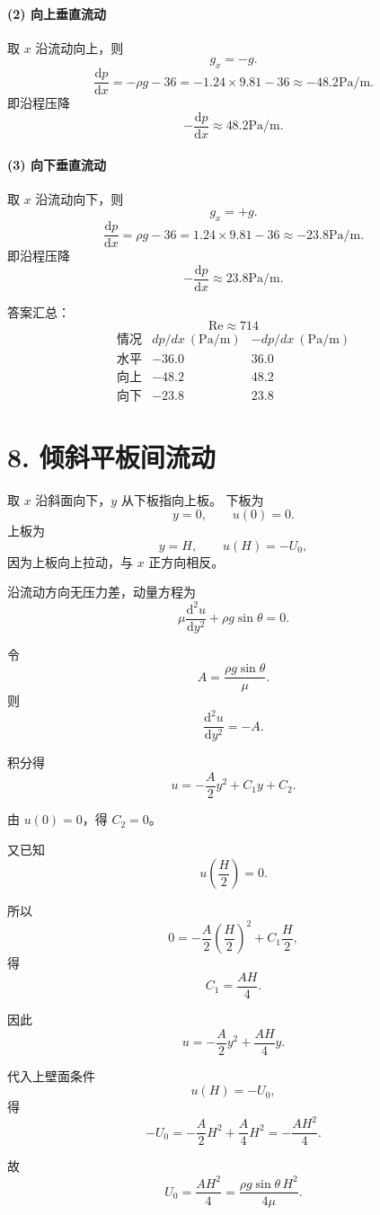 \documentclass[12pt,a4paper]{ctexart}
\newcommand{\Rey}{\mathrm{Re}}
\newcommand{\dd}{\mathrm d}
\begin{document}
\paragraph{(2) 向上垂直流动}
取 \(x\) 沿流动向上，则
\[
g_x=-g.
\]
\[
\frac{\dd p}{\dd x}
=-\rho g-36
=-1.24\times9.81-36
\approx-48.2\mathrm{Pa/m}.
\]
即沿程压降
\[
-\frac{\dd p}{\dd x}\approx48.2\mathrm{Pa/m}.
\]

\paragraph{(3) 向下垂直流动}
取 \(x\) 沿流动向下，则
\[
g_x=+g.
\]
\[
\frac{\dd p}{\dd x}
=\rho g-36
=1.24\times9.81-36
\approx-23.8\mathrm{Pa/m}.
\]
即沿程压降
\[
-\frac{\dd p}{\dd x}\approx23.8\mathrm{Pa/m}.
\]

答案汇总：
\[
\boxed{
\Rey\approx714
}
\]
\[
\boxed{
\begin{array}{c|c|c}
\text{情况} & dp/dx\ (\mathrm{Pa/m}) & -dp/dx\ (\mathrm{Pa/m})\\
\hline
\text{水平} & -36.0 & 36.0\\
\text{向上} & -48.2 & 48.2\\
\text{向下} & -23.8 & 23.8
\end{array}
}
\]

\section*{8. 倾斜平板间流动}

取 \(x\) 沿斜面向下，\(y\) 从下板指向上板。
下板为
\[
y=0,\qquad u(0)=0.
\]
上板为
\[
y=H,\qquad u(H)=-U_0,
\]
因为上板向上拉动，与 \(x\) 正方向相反。

沿流动方向无压力差，动量方程为
\[
\mu\frac{\dd^2u}{\dd y^2}+\rho g\sin\theta=0.
\]

令
\[
A=\frac{\rho g\sin\theta}{\mu}.
\]
则
\[
\frac{\dd^2u}{\dd y^2}=-A.
\]

积分得
\[
u=-\frac A2y^2+C_1y+C_2.
\]

由 \(u(0)=0\)，得 \(C_2=0\)。

又已知
\[
u\left(\frac H2\right)=0.
\]

所以
\[
0=-\frac A2\left(\frac H2\right)^2+C_1\frac H2,
\]
得
\[
C_1=\frac{AH}{4}.
\]

因此
\[
u=-\frac A2y^2+\frac{AH}{4}y.
\]

代入上壁面条件
\[
u(H)=-U_0,
\]
得
\[
-U_0=-\frac A2H^2+\frac A4H^2=-\frac{AH^2}{4}.
\]

故
\[
U_0=\frac{AH^2}{4}
=\frac{\rho g\sin\theta\,H^2}{4\mu}.
\]
\end{document}
